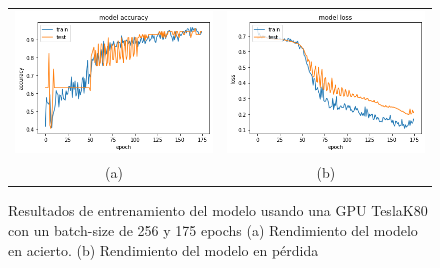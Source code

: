 \begin{figure}
    \centering
    \begin{tabular}{cc}
        \includegraphics[height=0.35\textwidth]{images/chapter5/batch_256_175_epoch.png} &
        \includegraphics[height=0.35\textwidth]{images/chapter5/batch_256_175_epoch_loss.png}\\
        (a) & (b)\\
    \end{tabular}
    \label{fig:Resultados de entrenamiento con un batch-size de 256 y 175 epochs}
    \caption{Resultados de entrenamiento del modelo usando una GPU TeslaK80 con un batch-size de 256 y 175 epochs (a) Rendimiento del modelo en acierto. (b) Rendimiento del modelo en pérdida}
\end{figure}

